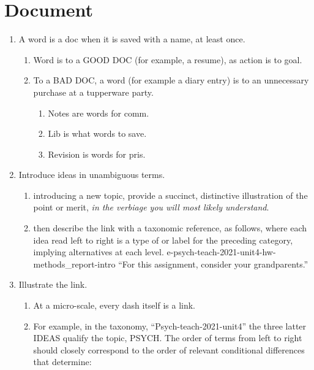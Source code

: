 \documentclass[
]{book}
\providecommand{\tightlist}{%
  \setlength{\itemsep}{0pt}\setlength{\parskip}{0pt}}
\begin{document}
\hypertarget{document}{%
\section{Document}\label{document}}

\begin{enumerate}
\def\labelenumi{\arabic{enumi}.}
\item
  A word is a doc when it is saved with a name, at least once.

  \begin{enumerate}
  \def\labelenumii{\arabic{enumii}.}
  \tightlist
  \item
    Word is to a GOOD DOC (for example, a resume), as action is to
    goal.
  \item
    To a BAD DOC, a word (for example a diary entry) is to an
    unnecessary purchase at a tupperware party.

    \begin{enumerate}
    \def\labelenumiii{\arabic{enumiii}.}
    \tightlist
    \item
      Notes are words for comm.
    \item
      Lib is what words to save.
    \item
      Revision is words for pris.
    \end{enumerate}
  \end{enumerate}
\item
  Introduce ideas in unambiguous terms.

  \begin{enumerate}
  \def\labelenumii{\arabic{enumii}.}
  \tightlist
  \item
    introducing a new topic, provide a succinct, distinctive
    illustration of the point or merit, \emph{in the verbiage you will
    most likely understand}.
  \item
    then describe the link with a taxonomic reference, as follows,
    where each idea read left to right is a type of or label for the
    preceding category, implying alternatives at each level.
    e-psych-teach-2021-unit4-hw-methods\_report-intro ``For this
    assignment, consider your grandparents.''
  \end{enumerate}
\item
  Illustrate the link.

  \begin{enumerate}
  \def\labelenumii{\arabic{enumii}.}
  \tightlist
  \item
    At a micro-scale, every dash itself is a link.
  \item
    For example, in the taxonomy, ``Psych-teach-2021-unit4'' the three
    latter IDEAS qualify the topic, PSYCH. The order of terms from
    left to right should closely correspond to the order of relevant
    conditional differences that determine:


\end{enumerate}
\end{enumerate}
\end{document}

